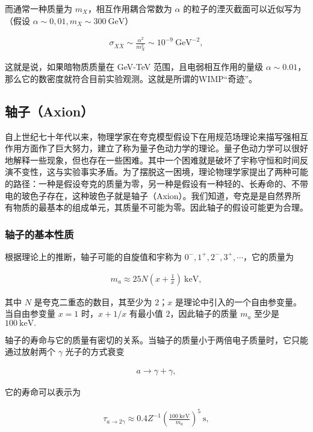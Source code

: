 而通常一种质量为 $m_X$，相互作用耦合常数为 $\alpha$ 的粒子的湮灭截面可以近似写为（假设 $\alpha\sim 0,01,m_X\sim 300~\mathrm{GeV}$）

\begin{align}
\sigma_{X\bar{X}} \sim \frac{\alpha^2 }{m_X^2 } \sim 10^{-9}~\mathrm{GeV}^{-2},
\end{align}

这就是说，如果暗物质质量在 GeV-TeV 范围，且电弱相互作用的量级 $\alpha\sim 0.01$，那么它的数密度就符合目前实验观测。这就是所谓的WIMP“奇迹”。

\subsection{轴子（Axion）}

自上世纪七十年代以来，物理学家在夸克模型假设下在用规范场理论来描写强相互作用方面作了巨大努力，建立了称为量子色动力学的理论。量子色动力学可以很好地解释一些现象，但也存在一些困难。其中一个困难就是破坏了宇称守恒和时间反演不变性，这与实验事实矛盾。为了摆脱这一困境，理论物理学家提出了两种可能的路径：一种是假设夸克的质量为零，另一种是假设有一种轻的、长寿命的、不带电的玻色子存在，这种玻色子就是轴子（Axion）。我们知道，夸克是是自然界所有物质的最基本的组成单元，其质量不可能为零。因此轴子的假设可能更为合理。\cite{张家铨1984寻找轴子的实验现状}

\subsubsection{轴子的基本性质}

根据理论上的推断，轴子可能的自旋值和宇称为 $0^-,1^+,2^-,3^+,\cdots$，它的质量为

\begin{align}
m_a
\approx 25 N \left(x+\frac{1 }{x }  \right)~\mathrm{keV},
\end{align}

其中 $N$ 是夸克二重态的数目，其至少为 $2$；$x$ 是理论中引入的一个自由参变量。当自由参变量 $x=1$ 时，$x+1/x$ 有最小值 $2$，因此轴子的质量 $m_a$ 至少是 $100~\mathrm{keV} .$

轴子的寿命与它的质量有密切的关系。当轴子的质量小于两倍电子质量时，它只能通过放射两个 $\gamma$ 光子的方式衰变

\begin{align}
a \to \gamma + \gamma,
\end{align}

它的寿命可以表示为

\begin{align}
\tau_{a\to 2\gamma}
\approx 0.4 Z^{-1} \left(\frac{100~\mathrm{keV} }{m_a }  \right)^5~\mathrm{s},
\end{align}

